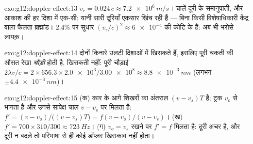 \begin{solution}{exo:g12:doppler-effect:13}
$v_r = 0.024\,c \approx \qty{7.2e6}{m/s}$। चालें दूरी के समानुपाती, और आकाश की हर दिशा में एक-सी: यानी सारी
दूरियाँ एकसार खिंच रही हैं --- बिना किसी विशेषाधिकारी केंद्र वाला फैलता
ब्रह्मांड। $2.4\%$ पर सुधार $(v_r/c)^2 \approx
\num{6e-4}$ की कोटि के हैं: अब भी भरोसे लायक़।
\end{solution}

\begin{solution}{exo:g12:doppler-effect:14}
दोनों किनारे उलटी दिशाओं में खिसकते हैं, इसलिए पूरी चकती की औसत रेखा
\emph{चौड़ी} होती है, खिसकती नहीं: पूरी चौड़ाई $2\lambda v/c = 2 \times 656.3 \times \num{2.0e3}/\num{3.00e8}
\approx \qty{8.8e-3}{nm}$ (लगभग $\pm\qty{4.4e-3}{nm}$)।
\end{solution}

\begin{solution}{exo:g12:doppler-effect:15}
(क) कार के आगे शिखरों का अंतराल $(v - v_s)T$ है; ट्रक $v_o$ से भागता है और उनसे
सापेक्ष चाल $v - v_o$ पर मिलता है: $f' = (v - v_o)/\bigl((v - v_s)T\bigr) =
f(v - v_o)/(v - v_s)$। (ख) $f' = 700 \times 310/300 \approx \qty{723}{Hz}$। (ग) $v_o = v_s$ रखने पर
$f' = f$ मिलता है: दूरी अचर है, और दूरी न बदले तो परिभाषा से ही कोई डॉप्लर
खिसकाव नहीं होता।
\end{solution}

